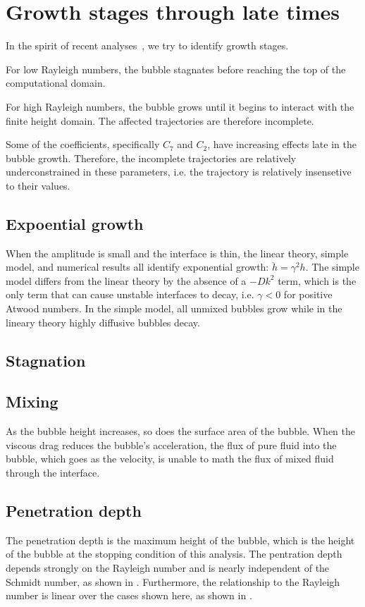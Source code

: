 \section{Growth stages through late times}

In the spirit of recent analyses~\cite{Ramaprabhu2012, Wei2012}, we try to identify growth stages.

For low Rayleigh numbers, the bubble stagnates before reaching the top of the computational domain.

For high Rayleigh numbers, the bubble grows until it begins to interact with the finite height domain.
The affected trajectories are therefore incomplete.

Some of the coefficients, specifically $C_7$ and $C_2$, have increasing effects late in the bubble growth.
Therefore, the incomplete trajectories are relatively underconstrained in these parameters, i.e. the trajectory is relatively insensetive to their values.


\subsection{Expoential growth}
When the amplitude is small and the interface is thin, the linear theory, simple model, and numerical results all identify exponential growth: $\ddot{h} = \gamma^2 h$.
The simple model differs from the linear theory by the absence of a $-D k^2$ term, which is the only term that can cause unstable interfaces to decay, i.e. $\gamma < 0$ for positive Atwood numbers.
In the simple model, all unmixed bubbles grow while in the lineary theory highly diffusive bubbles decay.

\subsection{Stagnation}



\subsection{Mixing}
As the bubble height increases, so does the surface area of the bubble.
When the viscous drag reduces the bubble's acceleration, the flux of pure fluid into the bubble, which goes as the velocity, is unable to math the flux of mixed fluid through the interface.



\subsection{Penetration depth}

The penetration depth is the maximum height of the bubble, which is the height of the bubble at the stopping condition of this analysis.
The pentration depth depends strongly on the Rayleigh number and is nearly independent of the Schmidt number, as shown in .
Furthermore, the relationship to the Rayleigh number is linear over the cases shown here, as shown in .

